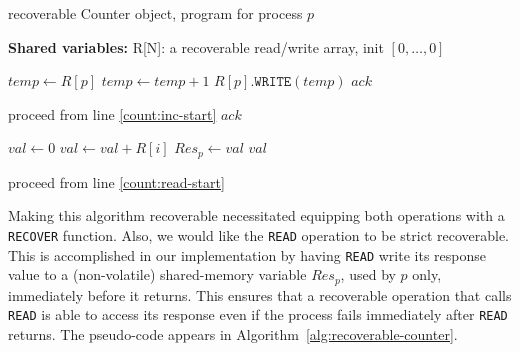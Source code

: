 \begin{algorithm}%

	\caption{recoverable Counter object, program for process $p$}
	\label{alg:recoverable-counter}
	
	\hspace*{\algorithmicindent} \textbf{Shared variables:}
	R[N]: a recoverable read/write array, init $[0,\ldots,0]$

	\begin{multicols}{2}
	\begin{algorithmic}[1]	
		\State $temp \gets R[p]$ \label{count:inc-start}
		\State $temp \gets temp+1$
		\State $R[p].\texttt{WRITE}(temp)$ \label{count:inc-invoke-write}
		\State \Return $ack$ \label{count:inc-return}
		\EndProcedure
		
			\State proceed from line \ref{count:inc-start}
		\Else{}
			\State \Return $ack$
		\EndIf
		\EndProcedure
		
		\columnbreak
		
		\State $val \gets 0$ \label{count:read-start}
			\State $val \gets val+R[i]$
		\EndFor
		\State $Res_p \gets val$
		\State \Return $val$
		\EndProcedure
		
		\State proceed from line \ref{count:read-start}
		\EndProcedure
	\end{algorithmic}
\end{multicols}
\end{algorithm}

Making this algorithm recoverable necessitated equipping both operations with a \texttt{RECOVER} function. Also, we would like the \texttt{READ} operation to be strict recoverable. This is accomplished in our implementation by having \texttt{READ} write its response value to a (non-volatile) shared-memory variable $Res_p$, used by $p$ only, immediately before it returns. This ensures that a recoverable operation that calls \texttt{READ} is able to access its response even if the process fails immediately after \texttt{READ} returns.
The pseudo-code appears in Algorithm~\ref{alg:recoverable-counter}.

